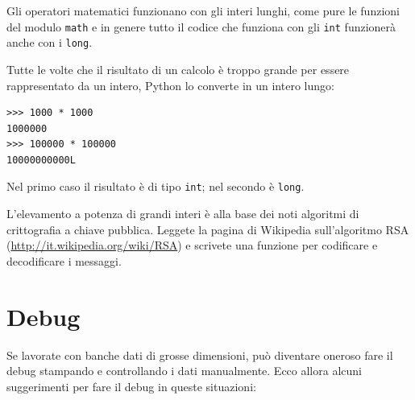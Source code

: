 \documentclass[10pt]{book}
\begin{document}
Gli operatori matematici funzionano con gli interi lunghi, come pure le funzioni del modulo {\tt math} e in genere tutto il codice che funziona con gli {\tt int} funzionerà anche con i {\tt long}.

Tutte le volte che il risultato di un calcolo è troppo grande per essere rappresentato da un intero, Python lo converte in un intero lungo:

\begin{verbatim}
>>> 1000 * 1000
1000000
>>> 100000 * 100000
10000000000L
\end{verbatim}
%
Nel primo caso il risultato è di tipo {\tt int}; nel secondo è {\tt long}.

\vspace{0.2in}
\begin{exercise}

L'elevamento a potenza di grandi interi è alla base dei noti algoritmi di crittografia a chiave pubblica. Leggete la pagina di Wikipedia sull'algoritmo RSA (\url{http://it.wikipedia.org/wiki/RSA}) e scrivete una funzione per codificare e decodificare i messaggi.


\end{exercise}


\section{Debug}

Se lavorate con banche dati di grosse dimensioni, può diventare oneroso fare il debug stampando e controllando i dati manualmente. Ecco allora alcuni suggerimenti per fare il debug in queste situazioni:
\end{document}
